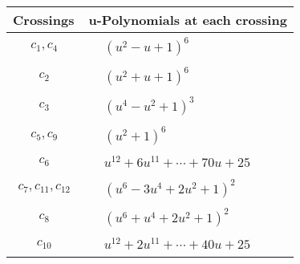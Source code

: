 \documentclass[1p]{elsarticle_modified}
\theoremstyle{definition}
\begin{document}
\begin{tabular}{m{50pt}|m{274pt}}
Crossings & \hspace{64pt}u-Polynomials at each crossing \\
\hline $$\begin{aligned}c_{1},c_{4}\end{aligned}$$&$\begin{aligned}
&(u^2- u+1)^6
\end{aligned}$\\
\hline $$\begin{aligned}c_{2}\end{aligned}$$&$\begin{aligned}
&(u^2+u+1)^6
\end{aligned}$\\
\hline $$\begin{aligned}c_{3}\end{aligned}$$&$\begin{aligned}
&(u^4- u^2+1)^3
\end{aligned}$\\
\hline $$\begin{aligned}c_{5},c_{9}\end{aligned}$$&$\begin{aligned}
&(u^2+1)^6
\end{aligned}$\\
\hline $$\begin{aligned}c_{6}\end{aligned}$$&$\begin{aligned}
&u^{12}+6 u^{11}+\cdots+70 u+25
\end{aligned}$\\
\hline $$\begin{aligned}c_{7},c_{11},c_{12}\end{aligned}$$&$\begin{aligned}
&(u^6-3 u^4+2 u^2+1)^2
\end{aligned}$\\
\hline $$\begin{aligned}c_{8}\end{aligned}$$&$\begin{aligned}
&(u^6+u^4+2 u^2+1)^2
\end{aligned}$\\
\hline $$\begin{aligned}c_{10}\end{aligned}$$&$\begin{aligned}
&u^{12}+2 u^{11}+\cdots+40 u+25
\end{aligned}$\\
\hline
\end{tabular}\\~\\
\end{document}
